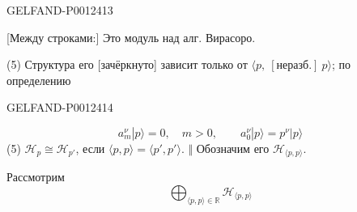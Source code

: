 \begin{GelfandAdjacentEvidence}{GELFAND-P001241}{3}


[Между строками:] Это модуль над алг. Вирасоро.

(5) Структура его [зачёркнуто] зависит только от $\langle p,\ [\text{неразб.}]\ p\rangle$; по определению
\end{GelfandAdjacentEvidence}
\begin{GelfandAdjacentEvidence}{GELFAND-P001241}{4}

\end{GelfandAdjacentEvidence}


\begin{equation*}
a_m^\nu|p\rangle=0,\quad m>0,\qquad
 a_0^\nu|p\rangle=p^\nu|p\rangle\tag{6}
\end{equation*}
(5) $\mathcal H_p\cong\mathcal H_{p'}$, если $\langle p,p\rangle=\langle p',p'\rangle$.
$\Vert$ Обозначим его $\mathcal H_{\langle p,p\rangle}$.

Рассмотрим
\begin{equation*}
\bigoplus_{\langle p,p\rangle\in\mathbb R}\mathcal H_{\langle p,p\rangle}\tag{7}
\end{equation*}


